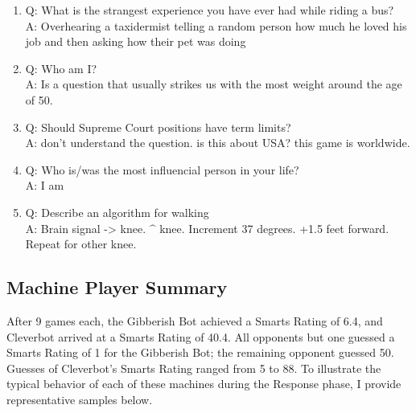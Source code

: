 \begin{enumerate}
\item Q: What is the strangest experience you have ever had while riding a bus?
\\ A: Overhearing a taxidermist telling a random person how much he loved his job and then asking how their pet was doing

\item Q: Who am I?
\\ A: Is a question that usually strikes us with the most weight around the age of 50.

\item Q: Should Supreme Court positions have term limits?
\\ A: don't understand the question. is this about USA? this game is worldwide.

\item Q: Who is/was the most influencial person in your life?
\\ A: I am

\item Q: Describe an algorithm for walking
\\ A: Brain signal -> knee. $\^$ knee. Increment 37 degrees. +1.5 feet forward. Repeat for other knee.
\end{enumerate}

\subsection{Machine Player Summary}

After 9 games each, the Gibberish Bot achieved a Smarts Rating of 6.4, and Cleverbot arrived at a Smarts Rating of 40.4. All opponents but one guessed a Smarts Rating of 1 for the Gibberish Bot; the remaining opponent guessed 50. Guesses of Cleverbot's Smarts Rating ranged from 5 to 88. To illustrate the typical behavior of each of these machines during the Response phase, I provide representative samples below.

